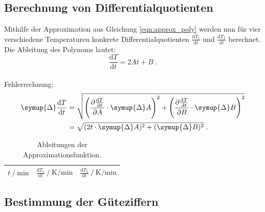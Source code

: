 \subsection{Berechnung von Differentialquotienten} %
Mithilfe der Approximation aus Gleichung \autoref{eqn:approx_poly} werden nun für vier verschiedene Temperaturen konkrete Differentialquotienten $\frac{\mathrm{d}T_1}{\mathrm{d}t}$ und $\frac{\mathrm{d}T_2}{\mathrm{d}t}$ berechnet.
Die Ableitung des Polynoms lautet:
\[
\frac{\mathrm{d}T}{\mathrm{d}t} = 2At + B \; .
\]
\\

Fehlerrechnung:
\begin{align*}
  \symup{\Delta} \frac{\mathrm{d}T}{\mathrm{d}t}
  &= \sqrt{\left(\frac{\partial \frac{\mathrm{d}T}{\mathrm{d}t}}{\partial A} \cdot \symup{\Delta} A\right)^2 + \left(\frac{\partial \frac{\mathrm{d}T}{\mathrm{d}t}}{\partial B} \cdot \symup{\Delta} B\right)^2} \\
  &= \sqrt{(2t \cdot \symup{\Delta} A)^2 + (\symup{\Delta} B)^2} \; .
\end{align*}

\begin{table}
\centering
\caption{Ableitungen der Approximationsfunktion.}
\label{tab:derivatives}
\begin{tabular}{c c c}
\toprule
$t \mathbin{/} \si{\minute}$ &
$\frac{\mathrm{d}T_1}{\mathrm{d}t} \mathbin{/} \si{\kelvin\per\minute}$ &
$\frac{\mathrm{d}T_2}{\mathrm{d}t} \mathbin{/} \si{\kelvin\per\minute}$ \\
\midrule

\bottomrule
\end{tabular}
\end{table}


\subsection{Bestimmung der Güteziffern} %
\label{sec:auswertung_gueteziffern}

